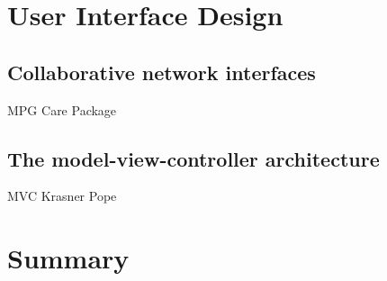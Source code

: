 \section{User Interface Design}

\subsection{Collaborative network interfaces}
	MPG Care Package 
\subsection{The model-view-controller architecture}
\label{sec:mvc_background}
	MVC Krasner Pope 

\section{Summary}

	